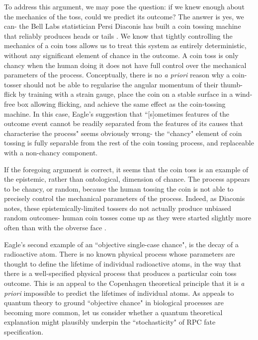 To address this argument, we may pose the question: if we knew enough about the mechanics of the toss, could we predict its outcome? The answer is yes, we can- the Bell Labs statistician Persi Diaconis has built a coin tossing machine that reliably produces heads or tails \cite{Kestenbaum2004}. We know that tightly controlling the mechanics of a coin toss allows us to treat this system as entirely deterministic, without any significant element of chance in the outcome. A coin toss is only chancy when the human doing it does not have full control over the mechanical parameters of the process. Conceptually, there is no \textit{a priori} reason why a coin-tosser should not be able to regularise the angular momentum of their thumb-flick by training with a strain gauge, place the coin on a stable surface in a wind-free box allowing flicking, and achieve the same effect as the coin-tossing machine. In this case, Eagle's suggestion that ``[s]ometimes features of the outcome event cannot be readily separated from the features of its causes that characterise the process" seems obviously wrong- the ``chancy" element of coin tossing is fully separable from the rest of the coin tossing process, and replaceable with a non-chancy component.

If the foregoing argument is correct, it seems that the coin toss is an example of the epistemic, rather than ontological, dimension of chance. The process appears to be chancy, or random, because the human tossing the coin is not able to precisely control the mechanical parameters of the process. Indeed, as Diaconis notes, these epistemically-limited tossers do not actually produce unbiased random outcomes- human coin tosses come up as they were started slightly more often than with the obverse face \cite{Diaconis2007}.

Eagle's second example of an ``objective single-case chance", is the decay of a radioactive atom. There is no known physical process whose parameters are thought to define the lifetime of individual radioactive atoms, in the way that there is a well-specified physical process that produces a particular coin toss outcome. This is an appeal to the Copenhagen theoretical principle that it is \textit{a priori} impossible to predict the lifetimes of individual atoms. As appeals to quantum theory to ground ``objective chance" in biological processes are becoming more common, let us consider whether a quantum theoretical explanation might plausibly underpin the ``stochasticity" of RPC fate specification.

